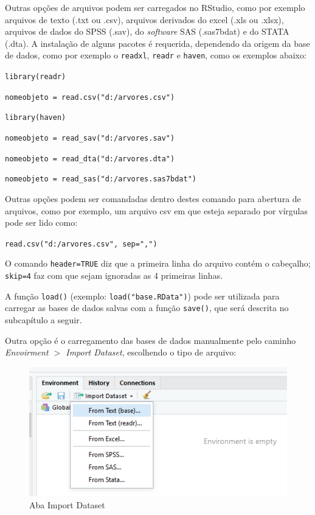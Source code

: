 \documentclass[12pt,brazil,oneside]{book}
\begin{document}
Outras opções de arquivos podem ser carregados no RStudio, como por exemplo arquivos de texto (.txt ou .csv), arquivos derivados do excel (.xls ou .xlsx), arquivos de dados do SPSS (.sav), do \emph{software} SAS (.sas7bdat) e do STATA (.dta). A instalação de alguns pacotes é requerida, dependendo da origem da base de dados, como por exemplo o \texttt{readxl}, \texttt{readr} e \texttt{haven}, como os exemplos abaixo:

\texttt{library(readr)}

\texttt{nomeobjeto\ =\ read.csv("d:/arvores.csv")}

\texttt{library(haven)}

\texttt{nomeobjeto\ =\ read\_sav("d:/arvores.sav")}

\texttt{nomeobjeto\ =\ read\_dta("d:/arvores.dta")}

\texttt{nomeobjeto\ =\ read\_sas("d:/arvores.sas7bdat")}

Outras opções podem ser comandadas dentro destes comando para abertura de arquivos, como por exemplo, um arquivo csv em que esteja separado por vírgulas pode ser lido como:

\texttt{read.csv("d:/arvores.csv",\ sep=",")}

O comando \texttt{header=TRUE} diz que a primeira linha do arquivo contém o cabeçalho; \texttt{skip=4} faz com que sejam ignoradas as 4 primeiras linhas.

A função \texttt{load()} (exemplo: \texttt{load("base.RData")}) pode ser utilizada para carregar as bases de dados salvas com a função \texttt{save()}, que será descrita no subcapítulo a seguir.

Outra opção é o carregamento das bases de dados manualmente pelo caminho \emph{Envoirment \(>\) Import Dataset}, escolhendo o tipo de arquivo:

\begin{figure}[H]

{\centering \includegraphics[width=0.8\linewidth]{r3} 

}

\caption{Aba Import Dataset}\label{fig:r3}
\end{figure}
\end{document}
